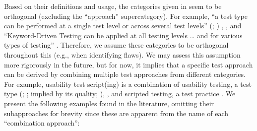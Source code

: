 \ifnotpaper
    \begin{landscape}
        \begin{table*}[hbtp!]
            \ieeeCatsTable{}
        \end{table*}
    \end{landscape}
\fi

Based on their definitions and usage, the categories given in
 seem to be orthogonal (excluding the ``approach''
supercategory). For example, ``a test type can be performed at a single test
level or across several test levels''
\ifnotpaper
    (\citealp[p.~15]{IEEE2022}; \citeyear[p.~7]{IEEE2021})%
\else
    \cite[p.~15]{IEEE2022}, \cite[p.~7]{IEEE2021}%
\fi, and ``Keyword-Driven Testing can be applied at all testing levels
\dots{} and for various types of testing'' \citeyearpar[p.~4]{IEEE2016}.
Therefore, we assume these categories to be orthogonal throughout this
\docType{} (e.g., when identifying flaws). We may assess this assumption more
rigorously in the future, but for now, it
implies that a specific test approach can be derived by combining multiple
test approaches from different categories. For example, usability test
script(ing) \citepISTQB{} is a combination of usability testing, a test type
\ifnotpaper (\citealp[pp.~22, 26--27]{IEEE2022};
    \citeyear[pp.~7, 40, Tab.~A.1]{IEEE2021}; implied by its quality;
    \citealp[p.~53]{Firesmith2015})\else \cite[pp.~22, 26--27]{IEEE2022},
    \cite[pp.~7, 40, Tab.~A.1]{IEEE2021}\fi, and scripted testing, a test
practice \citep[pp.~20, 22\ifnotpaper; implied by p.~33\fi]{IEEE2022}.
\ifnotpaper We present the following examples found in the literature, omitting
    their subapproaches for brevity since these are apparent from the name of
    each ``combination approach'':

